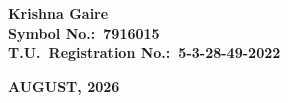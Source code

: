 \begin{center}
\vspace{0.2in}

{\fontsize{14}{18}\selectfont\textbf{Krishna Gaire}}\\[4pt]
{\fontsize{14}{18}\selectfont\textbf{Symbol No.:\ 7916015}}\\[4pt]
{\fontsize{14}{18}\selectfont\textbf{T.U.\ Registration No.:\ 5-3-28-49-2022}}

\vfill

{\fontsize{14}{18}\selectfont\textbf{AUGUST, 2026}}

\end{center}
\newpage